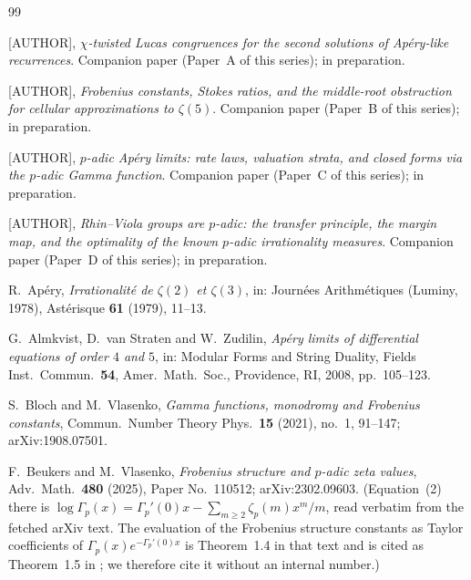 \documentclass[11pt,reqno]{article}
\newcommand{\Gp}{\Gamma_p}
\theoremstyle{plain}
\theoremstyle{definition}
\theoremstyle{remark}
\numberwithin{equation}{section}
\begin{document}
\begin{thebibliography}{99}


[AUTHOR],
\emph{$\chi$-twisted Lucas congruences for the second solutions of Ap\'ery-like
recurrences}.
Companion paper (Paper~A of this series); in preparation.

[AUTHOR],
\emph{Frobenius constants, Stokes ratios, and the middle-root obstruction for
cellular approximations to $\zeta(5)$}.
Companion paper (Paper~B of this series); in preparation.

[AUTHOR],
\emph{$p$-adic Ap\'ery limits: rate laws, valuation strata, and closed forms via
the $p$-adic Gamma function}.
Companion paper (Paper~C of this series); in preparation.

[AUTHOR],
\emph{Rhin--Viola groups are $p$-adic: the transfer principle, the margin map,
and the optimality of the known $p$-adic irrationality measures}.
Companion paper (Paper~D of this series); in preparation.

R.~Ap\'ery,
\emph{Irrationalit\'e de $\zeta(2)$ et $\zeta(3)$},
in: Journ\'ees Arithm\'etiques (Luminy, 1978),
Ast\'erisque \textbf{61} (1979), 11--13.

G.~Almkvist, D.~van Straten and W.~Zudilin,
\emph{Ap\'ery limits of differential equations of order $4$ and $5$},
in: Modular Forms and String Duality, Fields Inst.\ Commun.\ \textbf{54},
Amer.\ Math.\ Soc., Providence, RI, 2008, pp.~105--123.

S.~Bloch and M.~Vlasenko,
\emph{Gamma functions, monodromy and Frobenius constants},
Commun.\ Number Theory Phys.\ \textbf{15} (2021), no.~1, 91--147;
arXiv:1908.07501.

F.~Beukers and M.~Vlasenko,
\emph{Frobenius structure and $p$-adic zeta values},
Adv.\ Math.\ \textbf{480} (2025), Paper No.~110512; arXiv:2302.09603.
(Equation~(2) there is $\log\Gp(x)=\Gp'(0)x-\sum_{m\ge2}\zeta_p(m)x^m/m$, read
verbatim from the fetched arXiv text.  The evaluation of the Frobenius structure
constants as Taylor coefficients of $\Gp(x)e^{-\Gp'(0)x}$ is Theorem~1.4 in that
text and is cited as Theorem~1.5 in \cite{PaperC}; we therefore cite it without
an internal number.)


\end{thebibliography}
\end{document}
